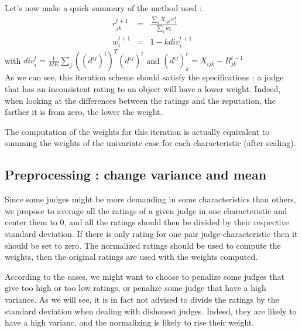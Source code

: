 \documentclass[12pt,a4paper]{article}
\begin{document}
Let's now make a quick summary of the method used :
\begin{eqnarray}
r^{t+1}_{jk} & = & \frac{\sum_{i}X_{ijk}w^t_{i}}{\sum_i w_{i}} \label{eq:rep} \\
w^{t+1}_i & = & 1 - k div^{t+1}_i \label{eq:w8}
\end{eqnarray}
with $div^t_i =  \frac{1}{MK}\sum_{j} ((d^{ij})^t)^T (d^{ij})^t$ and $ (d^{ij})^t_k = X_{ijk}-R^{t-1}_{jk}$\\




As we can see, this iteration scheme should satisfy the specifications : a judge that has an inconsistent rating to an object will have a lower weight. Indeed, when looking at the differences between the ratings and the reputation, the farther it is from zero, the lower the weight.

The computation of the weights for this iteration is actually equivalent to summing the weights of the univariate case for each characteristic (after scaling).


\subsection{Preprocessing : change variance and mean}
Since some judges might be more demanding in some characteristics than others, we propose to average all the ratings of a given judge in one characteristic and center them to $0$, and all the ratings should then be divided by their respective standard deviation. If there is only rating for one pair judge-characteristic then it should be set to zero. The normalized ratings should be used to compute the weights, then the original ratings are used with the weights computed.

According to the cases, we might want to choose to penalize some judges that give too high or too low ratings, or penalize some judge that have a high variance. As we will see, it is in fact not advised to divide the ratings by the standard deviation when dealing with dishonest judges. Indeed, they are likely to have a high varianc, and the normalizing is likely to rise their weight.
\end{document}
